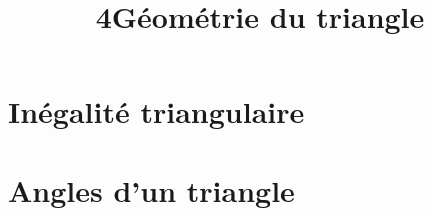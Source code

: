 \documentclass[12pt,a4paper]{article}
\date{}
\title{\textcircled{{\normalsize{4}}}Géométrie du triangle}
\begin{document}
\maketitle








\section{Inégalité triangulaire}





%
%

\section{Angles d'un triangle}


\end{document}
